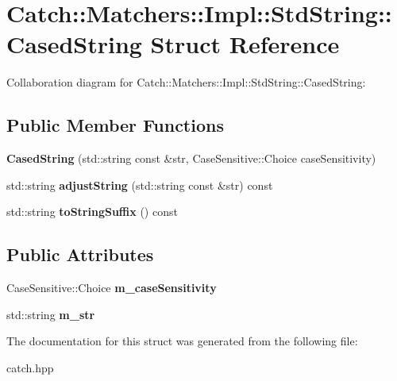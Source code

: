 \hypertarget{structCatch_1_1Matchers_1_1Impl_1_1StdString_1_1CasedString}{}\section{Catch\+:\+:Matchers\+:\+:Impl\+:\+:Std\+String\+:\+:Cased\+String Struct Reference}
\label{structCatch_1_1Matchers_1_1Impl_1_1StdString_1_1CasedString}


Collaboration diagram for Catch\+:\+:Matchers\+:\+:Impl\+:\+:Std\+String\+:\+:Cased\+String\+:
\subsection*{Public Member Functions}
\begin{DoxyCompactItemize}
\item 
{\bfseries Cased\+String} (std\+::string const \&str, Case\+Sensitive\+::\+Choice case\+Sensitivity)\hypertarget{structCatch_1_1Matchers_1_1Impl_1_1StdString_1_1CasedString_aebd017c88423d8a11c62cff85754a22d}{}\label{structCatch_1_1Matchers_1_1Impl_1_1StdString_1_1CasedString_aebd017c88423d8a11c62cff85754a22d}

\item 
std\+::string {\bfseries adjust\+String} (std\+::string const \&str) const \hypertarget{structCatch_1_1Matchers_1_1Impl_1_1StdString_1_1CasedString_aaf5c4be8b3b8b317777d0e332d3733b5}{}\label{structCatch_1_1Matchers_1_1Impl_1_1StdString_1_1CasedString_aaf5c4be8b3b8b317777d0e332d3733b5}

\item 
std\+::string {\bfseries to\+String\+Suffix} () const \hypertarget{structCatch_1_1Matchers_1_1Impl_1_1StdString_1_1CasedString_ae5865fa1dd20c80498a094cae5459883}{}\label{structCatch_1_1Matchers_1_1Impl_1_1StdString_1_1CasedString_ae5865fa1dd20c80498a094cae5459883}

\end{DoxyCompactItemize}
\subsection*{Public Attributes}
\begin{DoxyCompactItemize}
\item 
Case\+Sensitive\+::\+Choice {\bfseries m\+\_\+case\+Sensitivity}\hypertarget{structCatch_1_1Matchers_1_1Impl_1_1StdString_1_1CasedString_af399ed93051d8981e298206dee6898b3}{}\label{structCatch_1_1Matchers_1_1Impl_1_1StdString_1_1CasedString_af399ed93051d8981e298206dee6898b3}

\item 
std\+::string {\bfseries m\+\_\+str}\hypertarget{structCatch_1_1Matchers_1_1Impl_1_1StdString_1_1CasedString_a9f8ce063a934330ac59bf8638f047e99}{}\label{structCatch_1_1Matchers_1_1Impl_1_1StdString_1_1CasedString_a9f8ce063a934330ac59bf8638f047e99}

\end{DoxyCompactItemize}


The documentation for this struct was generated from the following file\+:\begin{DoxyCompactItemize}
\item 
catch.\+hpp\end{DoxyCompactItemize}
